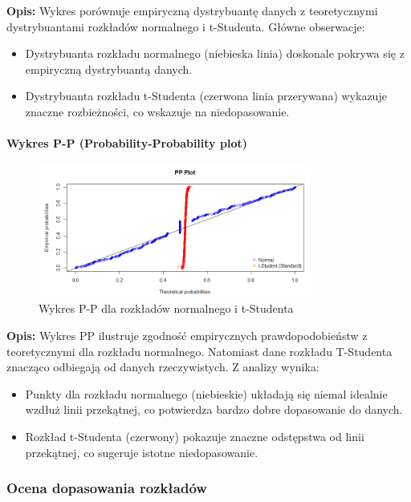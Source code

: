 \documentclass[a4paper,11pt]{article}
\begin{document}
\textbf{Opis:} Wykres porównuje empiryczną dystrybuantę danych z teoretycznymi dystrybuantami rozkładów normalnego i t-Studenta.  
Główne obserwacje:
\begin{itemize}
    \item Dystrybuanta rozkładu normalnego (niebieska linia) doskonale pokrywa się z empiryczną dystrybuantą danych.
    \item Dystrybuanta rozkładu t-Studenta (czerwona linia przerywana) wykazuje znaczne rozbieżności, co wskazuje na niedopasowanie.
\end{itemize}

\paragraph{Wykres P-P (Probability-Probability plot)}

\begin{figure}[H]
    \centering
    \includegraphics[width=0.8\textwidth]{./Wojtek/wykres-pp.png}
    \caption{Wykres P-P dla rozkładów normalnego i t-Studenta}
    \label{fig:pp_plot}
\end{figure}

\textbf{Opis:} Wykres PP ilustruje zgodność empirycznych prawdopodobieństw z teoretycznymi dla rozkładu normalnego. Natomiast dane rozkładu T-Studenta znacząco odbiegają od danych rzeczywistych.  
Z analizy wynika:
\begin{itemize}
    \item Punkty dla rozkładu normalnego (niebieskie) układają się niemal idealnie wzdłuż linii przekątnej, co potwierdza bardzo dobre dopasowanie do danych.
    \item Rozkład t-Studenta (czerwony) pokazuje znaczne odstępstwa od linii przekątnej, co sugeruje istotne niedopasowanie.
\end{itemize}

\subsubsection{Ocena dopasowania rozkładów}
\end{document}
